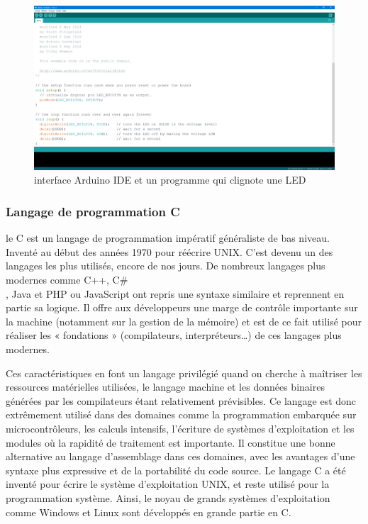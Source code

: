 \begin{figure}[h!]
    \centering
    \includegraphics[scale=0.3]{images/arduino_ide.PNG}
    \caption{interface Arduino IDE et un programme qui clignote une LED}
    \label{fig61}
\end{figure}

\subsubsection{Langage de programmation C}
le C est un langage de programmation impératif généraliste de bas niveau. Inventé 
au début des années 1970 pour réécrire UNIX. C’est devenu un des langages les 
plus utilisés, encore de nos jours. De nombreux langages plus modernes comme 
C++, C\#\\, Java et PHP ou JavaScript ont repris une syntaxe similaire et 
reprennent en partie sa logique. Il offre aux développeurs une marge de contrôle 
importante sur la machine (notamment sur la gestion de la mémoire) et est de ce 
fait utilisé pour réaliser les « fondations » (compilateurs, interpréteurs…) de 
ces langages plus modernes.

Ces caractéristiques en font un langage privilégié quand on cherche à maîtriser 
les ressources matérielles utilisées, le langage machine et les données binaires 
générées par les compilateurs étant relativement prévisibles. Ce langage est 
donc extrêmement utilisé dans des domaines comme la programmation embarquée sur 
microcontrôleurs, les calculs intensifs, l’écriture de systèmes d’exploitation 
et les modules où la rapidité de traitement est importante. Il constitue une 
bonne alternative au langage d’assemblage dans ces domaines, avec les avantages 
d’une syntaxe plus expressive et de la portabilité du code source. Le langage C 
a été inventé pour écrire le système d’exploitation UNIX, et reste utilisé pour 
la programmation système. Ainsi, le noyau de grands systèmes d’exploitation comme 
Windows et Linux sont développés en grande partie en C.

